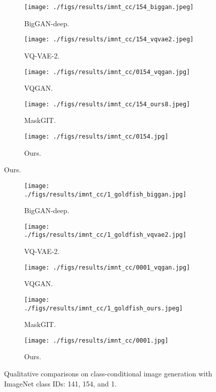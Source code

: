 \documentclass[10pt,twocolumn,letterpaper]{article}
\begin{document}
\begin{figure}[t]
    \centering
     \begin{subfigure}[b]{0.19\textwidth}
         \centering
         \texttt{[image: ./figs/results/imnt\_cc/154\_biggan.jpeg]}
         \caption{BigGAN-deep.}
     \end{subfigure}
     \begin{subfigure}[b]{0.19\textwidth}
         \centering
         \texttt{[image: ./figs/results/imnt\_cc/154\_vqvae2.jpeg]}
         \caption{VQ-VAE-2.}
     \end{subfigure}
     \begin{subfigure}[b]{0.19\textwidth}
         \centering
         \texttt{[image: ./figs/results/imnt\_cc/0154\_vqgan.jpg]}
         \caption{VQGAN.}
     \end{subfigure}
     \begin{subfigure}[b]{0.19\textwidth}
         \centering
         \texttt{[image: ./figs/results/imnt\_cc/154\_ours8.jpeg]}
         \caption{MaskGIT.}
     \end{subfigure}
     \begin{subfigure}[b]{0.19\textwidth}
         \centering
         \texttt{[image: ./figs/results/imnt\_cc/0154.jpg]}
         \caption{Ours.}
     \end{subfigure}
\end{figure}

\begin{figure}[t]
    \centering
     \begin{subfigure}[b]{0.19\textwidth}
         \centering
         \texttt{[image: ./figs/results/imnt\_cc/1\_goldfish\_biggan.jpg]}
         \caption{BigGAN-deep.}
     \end{subfigure}
     \begin{subfigure}[b]{0.19\textwidth}
         \centering
         \texttt{[image: ./figs/results/imnt\_cc/1\_goldfish\_vqvae2.jpg]}
         \caption{VQ-VAE-2.}
     \end{subfigure}
     \begin{subfigure}[b]{0.19\textwidth}
         \centering
         \texttt{[image: ./figs/results/imnt\_cc/0001\_vqgan.jpg]}
         \caption{VQGAN.}
     \end{subfigure}
     \begin{subfigure}[b]{0.19\textwidth}
         \centering
         \texttt{[image: ./figs/results/imnt\_cc/1\_goldfish\_ours.jpeg]}
         \caption{MaskGIT.}
     \end{subfigure}
     \begin{subfigure}[b]{0.19\textwidth}
         \centering
         \texttt{[image: ./figs/results/imnt\_cc/0001.jpg]}
         \caption{Ours.}
     \end{subfigure}
     \caption{Qualitative comparisons on class-conditional image generation with ImageNet class IDs: 141, 154, and 1.}
    \label{fig:conds_app2}
\end{figure}
\clearpage
\end{document}
